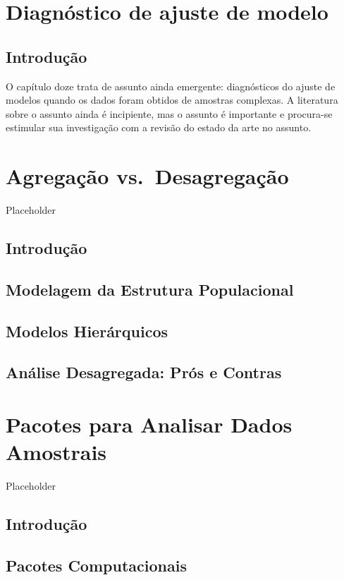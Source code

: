 \documentclass[
]{book}
\begin{document}
\hypertarget{diagnuxf3stico-de-ajuste-de-modelo}{%
\chapter{Diagnóstico de ajuste de modelo}\label{diagnuxf3stico-de-ajuste-de-modelo}}

\hypertarget{introduuxe7uxe3o-6}{%
\section{Introdução}\label{introduuxe7uxe3o-6}}

O capítulo doze trata de assunto ainda emergente: diagnósticos do ajuste de modelos
quando os dados foram obtidos de amostras complexas. A literatura sobre o assunto ainda
é incipiente, mas o assunto é importante e procura-se estimular sua investigação com a
revisão do estado da arte no assunto.

\hypertarget{agregdesag}{%
\chapter{Agregação vs.~Desagregação}\label{agregdesag}}

Placeholder

\hypertarget{introduuxe7uxe3o-7}{%
\section{Introdução}\label{introduuxe7uxe3o-7}}

\hypertarget{modelagem-da-estrutura-populacional}{%
\section{Modelagem da Estrutura Populacional}\label{modelagem-da-estrutura-populacional}}

\hypertarget{modelos-hieruxe1rquicos-1}{%
\section{Modelos Hierárquicos}\label{modelos-hieruxe1rquicos-1}}

\hypertarget{anuxe1lise-desagregada-pruxf3s-e-contras}{%
\section{Análise Desagregada: Prós e Contras}\label{anuxe1lise-desagregada-pruxf3s-e-contras}}

\hypertarget{pacotes}{%
\chapter{Pacotes para Analisar Dados Amostrais}\label{pacotes}}

Placeholder

\hypertarget{introduuxe7uxe3o-8}{%
\section{Introdução}\label{introduuxe7uxe3o-8}}

\hypertarget{pacotes-computacionais}{%
\section{Pacotes Computacionais}\label{pacotes-computacionais}}

  
\end{document}
